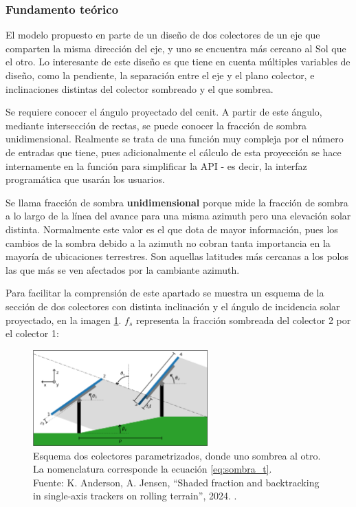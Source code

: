 \subsubsection{Fundamento teórico}

El \gls{modelo} propuesto en \cite{Anderson_Jensen_2024} parte de un diseño de dos \gls{colectores} de un eje que comparten la misma dirección del eje, y uno se encuentra más cercano al Sol que el otro. Lo interesante de este diseño es que tiene en cuenta múltiples variables de diseño, como la pendiente, la separación entre el eje y el plano colector, e inclinaciones distintas del colector sombreado y el que sombrea.

Se requiere conocer el ángulo proyectado del \gls{cenit}. A partir de este ángulo, mediante intersección de rectas, se puede conocer la fracción de \gls{sombra} unidimensional. Realmente se trata de una función muy compleja por el número de entradas que tiene, pues adicionalmente el cálculo de esta proyección se hace internamente en la función para simplificar la \gls{API} - es decir, la interfaz programática que usarán los usuarios.

Se llama fracción de \gls{sombra} \textbf{unidimensional} porque mide la fracción de \gls{sombra} a lo largo de la línea del avance para una misma azimuth pero una elevación solar distinta. Normalmente este valor es el que dota de mayor información, pues los cambios de la \gls{sombra} debido a la azimuth no cobran tanta importancia en la mayoría de ubicaciones terrestres. Son aquellas latitudes más cercanas a los polos las que más se ven afectados por la cambiante azimuth.

Para facilitar la comprensión de este apartado se muestra un esquema de la sección de dos \gls{colectores} con distinta inclinación y el ángulo de incidencia solar proyectado, en la imagen \ref{fig:fraccion_sombra}. $f_s$ representa la fracción sombreada del colector 2 por el colector 1:

\begin{figure}[H]
    \centering
    \includegraphics[width=0.6\textwidth]{./images/shading_1d/Anderson_Jensen_Fig3.png}
    \caption{Esquema dos \gls{colectores} parametrizados, donde uno sombrea al otro. La nomenclatura corresponde la ecuación \ref{eq:sombra_t}.\\Fuente: K. Anderson, A. Jensen, ``Shaded fraction and backtracking in single-axis trackers on rolling terrain'', 2024. \cite[Fig. 3]{Anderson_Jensen_2024}.}
    \label{fig:fraccion_sombra}
\end{figure}

